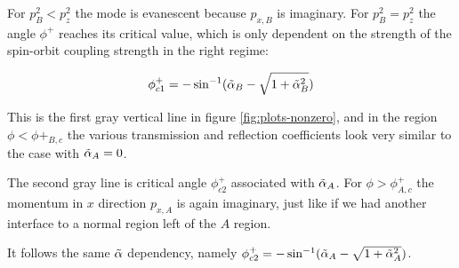 For $p_B^2 < p_z^2$ the mode is evanescent because $p_{x,B}$ is
imaginary. For $p_B^2 = p_z^2$ the angle $\phi^+$ reaches its critical
value, which is only dependent on the strength of the spin-orbit
coupling strength in the right regime:

\begin{align}
    \phi^+_{c1} = -\sin^{-1}(\tilde \alpha_B - \sqrt{1+\tilde \alpha_B^2})
\end{align}

This is the first gray vertical line in figure
\ref{fig:plots-nonzero}, and in the region $\phi < \phi+_{B,c}$ the various transmission and reflection
coefficients look very similar to the case with $\tilde \alpha_A = 0$.

The second gray line is critical angle $\phi^+_{c2}$ associated with
$\tilde \alpha_A$. For
$\phi > \phi^+_{A,c}$ the momentum in $x$ direction $p_{x,A}$ is again
imaginary, just like if we had another interface to a normal region
left of the $A$ region. 

It follows the same $\tilde \alpha$ dependency, namely $\phi^+_{c2} =
-\sin^{-1}(\tilde \alpha_A - \sqrt{1+\tilde \alpha_A^2})$.

%
%

